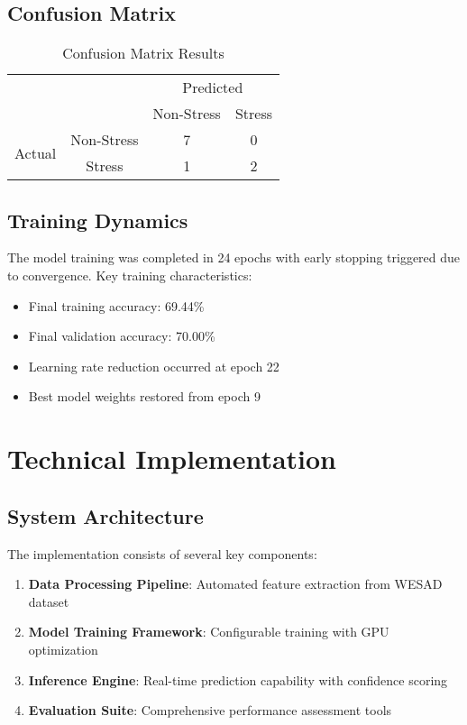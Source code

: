 \documentclass[11pt,a4paper]{article}
\begin{document}
\subsection{Confusion Matrix}

\begin{table}[H]
\centering
\caption{Confusion Matrix Results}
\begin{tabular}{cc|cc}
\toprule
& & \multicolumn{2}{c}{Predicted} \\
& & Non-Stress & Stress \\
\midrule
\multirow{2}{*}{Actual} & Non-Stress & 7 & 0 \\
& Stress & 1 & 2 \\
\bottomrule
\end{tabular}
\end{table}

\subsection{Training Dynamics}

The model training was completed in 24 epochs with early stopping triggered due to convergence. Key training characteristics:

\begin{itemize}
    \item Final training accuracy: 69.44\%
    \item Final validation accuracy: 70.00\%
    \item Learning rate reduction occurred at epoch 22
    \item Best model weights restored from epoch 9
\end{itemize}

\section{Technical Implementation}

\subsection{System Architecture}

The implementation consists of several key components:

\begin{enumerate}
    \item \textbf{Data Processing Pipeline}: Automated feature extraction from WESAD dataset
    \item \textbf{Model Training Framework}: Configurable training with GPU optimization
    \item \textbf{Inference Engine}: Real-time prediction capability with confidence scoring
    \item \textbf{Evaluation Suite}: Comprehensive performance assessment tools
\end{enumerate}
\end{document}
